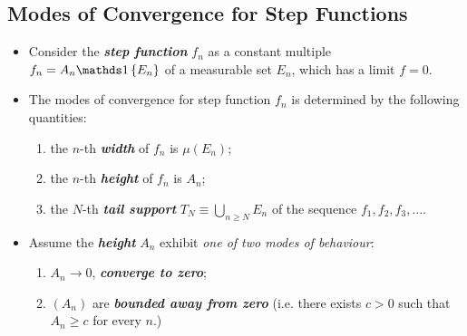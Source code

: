 \documentclass[11pt]{article}
\begin{document}
\subsection{Modes of Convergence for Step Functions}
\begin{itemize}
\item \begin{remark}
Consider the \emph{\textbf{step function}} $f_{n}$ as a constant multiple $f_n = A_n\ind{E_n}$ of a measurable set $E_n$, which has a limit $f=0$.
\end{remark}

\item  \begin{definition} The modes of convergence for step function $f_n$ is determined by the following quantities: 
\begin{enumerate}
\item the $n$-th \emph{\textbf{width}} of $f_{n}$ is $\mu(E_{n})$; 
\item the $n$-th \emph{\textbf{height}} of $f_{n}$ is $A_{n}$;
\item the $N$-th \emph{\textbf{tail support}} $T_N \equiv \bigcup_{n\ge N}E_{n}$ of the sequence $f_1, f_2, f_3, \ldots$.
\end{enumerate}
 \end{definition}
 
 \item \begin{remark}
Assume the \emph{\textbf{height}} $A_n$ exhibit \emph{one of two modes of behaviour}:
\begin{enumerate}
\item $A_n \rightarrow 0$, \emph{\textbf{converge to zero}};
\item $(A_n)$ are \emph{\textbf{bounded away from zero}} (i.e. there exists $c > 0$ such that $A_n \ge c$ for every $n$.) 
\end{enumerate}

  
 \end{remark}


\end{itemize}
\end{document}
